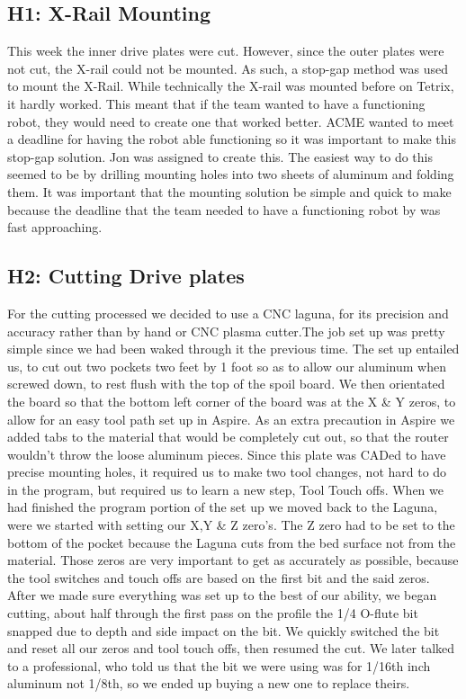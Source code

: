 \documentclass{article}
\begin{document}
\subsection{H1: X-Rail Mounting}

This week the inner drive plates were cut. However, since the outer plates were not cut, the X-rail could not be mounted. As such, a stop-gap method was used to mount the X-Rail. While technically the X-rail was mounted before on Tetrix, it hardly worked. This meant that if the team wanted to have a functioning robot, they would need to create one that worked better. ACME wanted to meet a deadline for having the robot able functioning so it was important to make this stop-gap solution. Jon was assigned to create this. The easiest way to do this seemed to be by drilling mounting holes into two sheets of aluminum and folding them. It was important that the mounting solution be simple and quick to make because the deadline that the team needed to have a functioning robot by was fast approaching. 

\subsection{H2: Cutting Drive plates}

For the cutting processed we decided to use a CNC laguna, for its precision and accuracy rather than by hand or CNC plasma cutter.The job set up was pretty simple since we had been waked through it the previous time. The set up entailed us, to cut out two pockets two feet by 1 foot so as to allow our aluminum when screwed down, to rest flush with the top of the spoil board. We then orientated the board so that the bottom left corner of the board was at the X \& Y zeros, to allow for an easy tool path set up in Aspire. As an extra precaution in Aspire we added tabs to the material that would be completely cut out, so that the router wouldn't throw the loose aluminum pieces. Since this plate was CADed to have precise mounting holes, it required us to make two tool changes, not hard to do in the program, but required us to learn a new step, Tool Touch offs. When we had finished the program portion of the set up we moved back to the Laguna, were we started with setting our X,Y \& Z zero's. The Z zero had to be set to the bottom of the pocket because the Laguna cuts from the bed surface not from the material. Those zeros are very important to get as accurately as possible, because the tool switches and touch offs are based on the first bit and the said zeros. After we made sure everything was set up to the best of our ability, we began cutting, about half through the first pass on the profile the 1/4 O-flute bit snapped due to depth and side impact on the bit. We quickly switched the bit and reset all our zeros and tool touch offs, then resumed the cut. We later talked to a professional, who told us that the bit we were using was for 1/16th inch aluminum not 1/8th, so we ended up buying a new one to replace theirs.  
\end{document}
